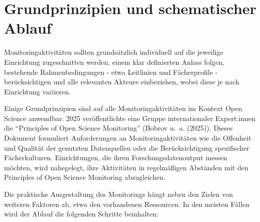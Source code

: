 \documentclass[
  ngerman,
  letterpaper,
  DIV=11]{scrreprt}
\begin{document}
\section{Grundprinzipien und schematischer
Ablauf}\label{grundprinzipien-und-schematischer-ablauf}

Monitoringaktivitäten sollten grundsätzlich individuell auf die
jeweilige Einrichtung zugeschnitten werden, einem klar definierten
Anlass folgen, bestehende Rahmenbedingungen - etwa Leitlinien und
Fächerprofile - berücksichtigen und alle relevanten Akteure einbeziehen,
wobei diese je nach Einrichtung variieren.

Einige Grundprinzipien sind auf alle Monitoringaktivitäten im Kontext
Open Science anwendbar. 2025 veröffentlichte eine Gruppe internationaler
Expert:innen die ``Principles of Open Science Monitoring'' (Bobrov u.~a.
(2025)). Dieses Dokument formuliert Anforderungen an
Monitoringaktivitäten wie die Offenheit und Qualität der genutzten
Datenquellen oder die Berücksichtigung spezifischer Fächerkulturen.
Einrichtungen, die ihren Forschungsdatenoutput messen möchten, wird
nahegelegt, ihre Aktivitäten in regelmäßigen Abständen mit den
Principles of Open Science Monitoring abzugleichen.

Die praktische Ausgestaltung des Monitorings hängt neben den Zielen von
weiteren Faktoren ab, etwa den vorhandenen Ressourcen. In den meisten
Fällen wird der Ablauf die folgenden Schritte beinhalten:
\end{document}
